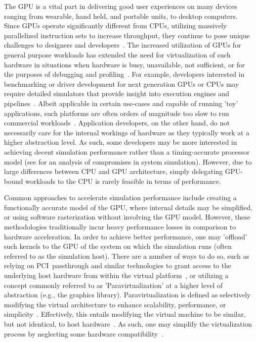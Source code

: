 The GPU is a vital part in delivering good user experiences on many devices ranging from wearable, hand held, and portable units, to desktop computers.
Since GPUs operate significantly different from CPUs, utilizing massively parallelized instruction sets to increase throughput, they continue to pose unique challenges to designers and developers~.
The increased utilization of GPUs for general purpose workloads has extended the need for virtualization of such hardware in situations when hardware is busy, unavailable, not sufficient, or for the purposes of debugging and profiling~.
For example, developers interested in benchmarking or driver development for next generation GPUs or CPUs may require detailed simulators that provide insight into execution engines and pipelines~.
Albeit applicable in certain use-cases and capable of running 'toy' applications, such platforms are often orders of magnitude too slow to run commercial workloads~.
Application developers, on the other hand, do not necessarily care for the internal workings of hardware as they typically work at a higher abstraction level.
As such, some developers may be more interested in achieving decent simulation performance rather than a timing-accurate processor model (see  for an analysis of compromises in system simulation).
However, due to large differences between CPU and GPU architecture, simply delegating GPU-bound workloads to the CPU is rarely feasible in terms of performance.

Common approaches to accelerate simulation performance include creating a functionally accurate model of the GPU, where internal details may be simplified, or using software rasterization without involving the GPU model.
However, these methodologies traditionally incur heavy performance losses in comparison to hardware acceleration.
In order to achieve better performance, one may 'offload' such kernels to the GPU of the system on which the simulation runs (often referred to as the simulation host).
There are a number of ways to do so, such as relying on PCI~passthrough and similar technologies to grant access to the underlying host hardware from within the virtual platform~, or utilizing a concept commonly referred to as 'Paravirtualization' at a higher level of abstraction (e.g., the graphics library).
Paravirtualization is defined as selectively modifying the virtual architecture to enhance scalability, performance, or simplicity~.
Effectively, this entails modifying the virtual machine to be similar, but not identical, to host hardware~.
As such, one may simplify the virtualization process by neglecting some hardware compatibility~.

